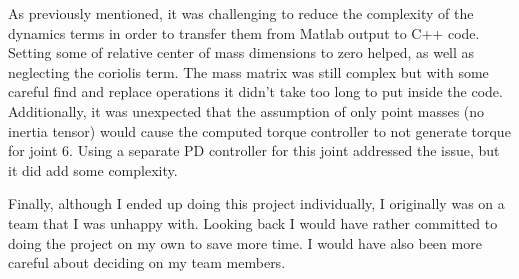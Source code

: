 \documentclass[conference]{IEEEtran}
\begin{document}
As previously mentioned, it was challenging to reduce the complexity of the
dynamics terms in order to transfer them from Matlab output to C++ code. Setting
some of relative center of mass dimensions to zero helped, as well as neglecting
the coriolis term. The mass matrix was still complex but with some careful find
and replace operations it didn't take too long to put inside the
code. Additionally, it was unexpected that the assumption of only point masses
(no inertia tensor) would cause the computed torque controller to not
generate torque for joint 6. Using a separate PD controller for this joint
addressed the issue, but it did add some complexity.

Finally, although I ended up doing this project individually, I originally was
on a team that I was unhappy with. Looking back I would have rather committed to
doing the project on my own to save more time. I would have also been more
careful about deciding on my team members.



\end{document}
